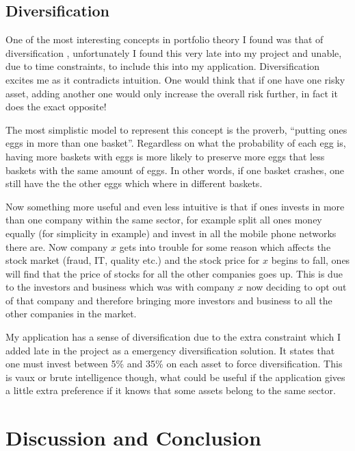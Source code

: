 \documentclass{pdfmx4020}
\begin{document}
  \section{Diversification} %
  \label{sec:diversification}
    One of the most interesting concepts in portfolio theory I found was that of diversification \cite{diversification_2}, unfortunately I found this very late into my project and unable, due to time constraints, to include this into my application. Diversification excites me as it contradicts intuition. One would think that if one have one risky asset, adding another one would only increase the overall risk further, in fact it does the exact opposite!

    The most simplistic model to represent this concept is the proverb, ``putting ones eggs in more than one basket''. Regardless on what the probability of each egg is, having more baskets with eggs is more likely to preserve more eggs that less baskets with the same amount of eggs. In other words, if one basket crashes, one still have the the other eggs which where in different baskets. 

    Now something more useful and even less intuitive is that if ones invests in more than one company within the same sector, for example split all ones money equally (for simplicity in example) and invest in all the mobile phone networks there are. Now company $x$ gets into trouble for some reason which affects the stock market (fraud, IT, quality etc.) and the stock price for $x$ begins to fall, ones will find that the price of stocks for all the other companies goes up. This is due to the investors and business which was with company $x$ now deciding to opt out of that company and therefore bringing more investors and business to all the other companies in the market. 

    My application has a sense of diversification due to the extra constraint which I added late in the project as a emergency diversification solution. It states that one must invest between 5\% and 35\% on each asset to force diversification. This is vaux or brute intelligence though, what could be useful if the application gives a little extra preference if it knows that some assets belong to the same sector. 


\chapter{Discussion and Conclusion}
  
\end{document}
